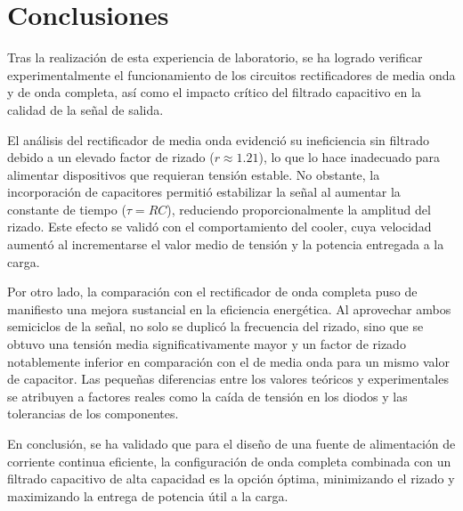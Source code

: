 \section{Conclusiones}
Tras la realización de esta experiencia de laboratorio, se ha logrado verificar experimentalmente el funcionamiento de los circuitos rectificadores de media onda y de onda completa, así como el impacto crítico del filtrado capacitivo en la calidad de la señal de salida.

El análisis del rectificador de media onda evidenció su ineficiencia sin filtrado debido a un elevado factor de rizado ($r \approx 1.21$), lo que lo hace inadecuado para alimentar dispositivos que requieran tensión estable. No obstante, la incorporación de capacitores permitió estabilizar la señal al aumentar la constante de tiempo ($\tau = RC$), reduciendo proporcionalmente la amplitud del rizado. Este efecto se validó con el comportamiento del cooler, cuya velocidad aumentó al incrementarse el valor medio de tensión y la potencia entregada a la carga.

Por otro lado, la comparación con el rectificador de onda completa puso de manifiesto una mejora sustancial en la eficiencia energética. Al aprovechar ambos semiciclos de la señal, no solo se duplicó la frecuencia del rizado, sino que se obtuvo una tensión media significativamente mayor y un factor de rizado notablemente inferior en comparación con el de media onda para un mismo valor de capacitor. Las pequeñas diferencias entre los valores teóricos y experimentales se atribuyen a factores reales como la caída de tensión en los diodos y las tolerancias de los componentes.

En conclusión, se ha validado que para el diseño de una fuente de alimentación de corriente continua eficiente, la configuración de onda completa combinada con un filtrado capacitivo de alta capacidad es la opción óptima, minimizando el rizado y maximizando la entrega de potencia útil a la carga.
